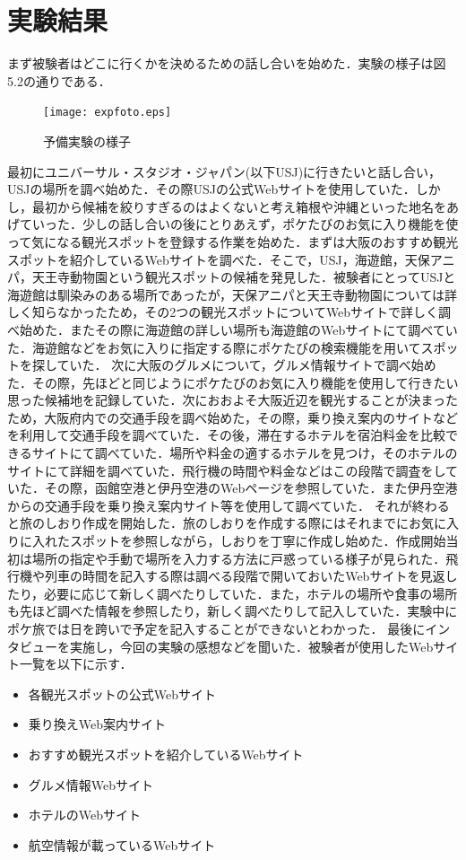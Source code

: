 \documentclass{funthesis}
\begin{document}
\section{実験結果}
まず被験者はどこに行くかを決めるための話し合いを始めた．実験の様子は図5.2の通りである．

\begin{figure}[htpb]
\begin{center}
\texttt{[image: expfoto.eps]}
\caption{予備実験の様子}
\end{center}
\end{figure}


最初にユニバーサル・スタジオ・ジャパン(以下USJ)に行きたいと話し合い，USJの場所を調べ始めた．その際USJの公式Webサイトを使用していた．しかし，最初から候補を絞りすぎるのはよくないと考え箱根や沖縄といった地名をあげていった．少しの話し合いの後にとりあえず，ポケたびのお気に入り機能を使って気になる観光スポットを登録する作業を始めた．まずは大阪のおすすめ観光スポットを紹介しているWebサイトを調べた．そこで，USJ，海遊館，天保アニパ，天王寺動物園という観光スポットの候補を発見した．被験者にとってUSJと海遊館は馴染みのある場所であったが，天保アニパと天王寺動物園については詳しく知らなかったため，その2つの観光スポットについてWebサイトで詳しく調べ始めた．またその際に海遊館の詳しい場所も海遊館のWebサイトにて調べていた．海遊館などをお気に入りに指定する際にポケたびの検索機能を用いてスポットを探していた．
次に大阪のグルメについて，グルメ情報サイトで調べ始めた．その際，先ほどと同じようにポケたびのお気に入り機能を使用して行きたい思った候補地を記録していた．次におおよそ大阪近辺を観光することが決まったため，大阪府内での交通手段を調べ始めた，その際，乗り換え案内のサイトなどを利用して交通手段を調べていた．その後，滞在するホテルを宿泊料金を比較できるサイトにて調べていた．場所や料金の適するホテルを見つけ，そのホテルのサイトにて詳細を調べていた．飛行機の時間や料金などはこの段階で調査をしていた．その際，函館空港と伊丹空港のWebページを参照していた．また伊丹空港からの交通手段を乗り換え案内サイト等を使用して調べていた．
それが終わると旅のしおり作成を開始した．旅のしおりを作成する際にはそれまでにお気に入りに入れたスポットを参照しながら，しおりを丁寧に作成し始めた．作成開始当初は場所の指定や手動で場所を入力する方法に戸惑っている様子が見られた．飛行機や列車の時間を記入する際は調べる段階で開いておいたWebサイトを見返したり，必要に応じて新しく調べたりしていた．また，ホテルの場所や食事の場所も先ほど調べた情報を参照したり，新しく調べたりして記入していた．実験中にポケ旅では日を跨いで予定を記入することができないとわかった．
最後にインタビューを実施し，今回の実験の感想などを聞いた．被験者が使用したWebサイト一覧を以下に示す．
\begin{itemize}
 \item 各観光スポットの公式Webサイト
 \item 乗り換えWeb案内サイト
 \item おすすめ観光スポットを紹介しているWebサイト
 \item グルメ情報Webサイト
 \item ホテルのWebサイト
 \item 航空情報が載っているWebサイト
\end{itemize}
\end{document}
